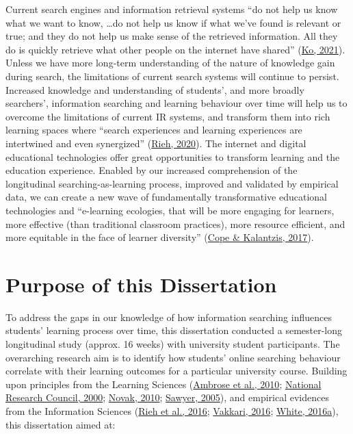 \documentclass[letterpaper, nobind]{templates/ociamthesis}
\begin{document}
Current search engines and information retrieval systems ``do not help us know what we want to know, \ldots do not help us know if what we've found is relevant or true; and they do not help us make sense of the retrieved information.
All they do is quickly retrieve what other people on the internet have shared'' (\protect\hyperlink{ref-ko2021seeking}{Ko, 2021}).
Unless we have more long-term understanding of the nature of knowledge gain during search, the limitations of current search systems will continue to persist.
Increased knowledge and understanding of students', and more broadly searchers', information searching and learning behaviour over time will help us to overcome the limitations of current IR systems, and transform them into rich learning spaces where ``search experiences and learning experiences are intertwined and even synergized'' (\protect\hyperlink{ref-url-rieh-homepage}{Rieh, 2020}).
The internet and digital educational technologies offer great opportunities to transform learning and the education experience.
Enabled by our increased comprehension of the longitudinal searching-as-learning process, improved and validated by empirical data, we can create a new wave of fundamentally transformative educational technologies and ``e-learning ecologies, that will be more engaging for learners, more effective (than traditional classroom practices), more resource efficient, and more equitable in the face of learner diversity'' (\protect\hyperlink{ref-cope2017elearningc}{Cope \& Kalantzis, 2017}).

\hypertarget{sec-intro-purpose}{%
\section{Purpose of this Dissertation}\label{sec-intro-purpose}}

To address the gaps in our knowledge of how information searching influences students' learning process over time, this dissertation conducted a semester-long longitudinal study (approx. 16 weeks) with university student participants.
The overarching research aim is to identify how students' online searching behaviour correlate with their learning outcomes for a particular university course.
Building upon principles from the Learning Sciences (\protect\hyperlink{ref-ambrose2010howa}{Ambrose et al., 2010}; \protect\hyperlink{ref-council2000how}{National Research Council, 2000}; \protect\hyperlink{ref-novak2010learninga}{Novak, 2010}; \protect\hyperlink{ref-sawyer2005cambridge}{Sawyer, 2005}),
and empirical evidences from the Information Sciences (\protect\hyperlink{ref-rieh2016searching}{Rieh et al., 2016}; \protect\hyperlink{ref-vakkari2016searching}{Vakkari, 2016}; \protect\hyperlink{ref-white2016interactions}{White, 2016a}),
this dissertation aimed at:
\end{document}
